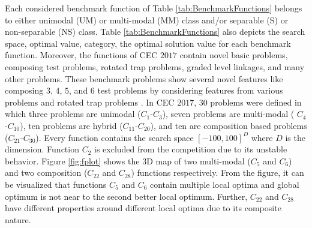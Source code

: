 Each considered benchmark function of Table \ref{tab:BenchmarkFunctions}  belongs to either unimodal (UM) or multi-modal (MM) class and/or separable (S) or non-separable (NS) class.  Table \ref{tab:BenchmarkFunctions} also depicts the search space, optimal value, category, the optimal solution value for each benchmark function. Moreover, the functions of CEC $2017$ contain novel basic problems, composing test problems, rotated trap problems, graded level linkages, and many other problems. These benchmark problems show several novel features like composing $3$, $4$, $5$, and $6$ test problems by considering features from various problems and rotated trap problems \cite{brest2017single}. In CEC $2017$, $30$ problems were defined in which three problems are unimodal ($C_1$-$C_3$), seven problems are multi-modal ( $C_4$-$C_{10}$), ten problems are hybrid ($C_{11}$-$C_{20}$), and ten are composition based problems ($C_{21}$-$C_{30}$). Every function contains the search space $[-100,100]^D$ where $D$ is the dimension. Function $C_2$ is excluded from the competition due to its unstable behavior. Figure \ref{fig:fplot} shows the 3D map of two multi-modal ($C_5$ and $C_6$) and two composition ($C_{22}$ and $C_{28}$) functions respectively. From the figure, it can be visualized that functions $C_5$ and $C_6$ contain multiple local optima and global optimum is not near to the second better local optimum. Further, $C_{22}$ and $C_{28}$ have different properties around different local optima due to its composite nature. 
